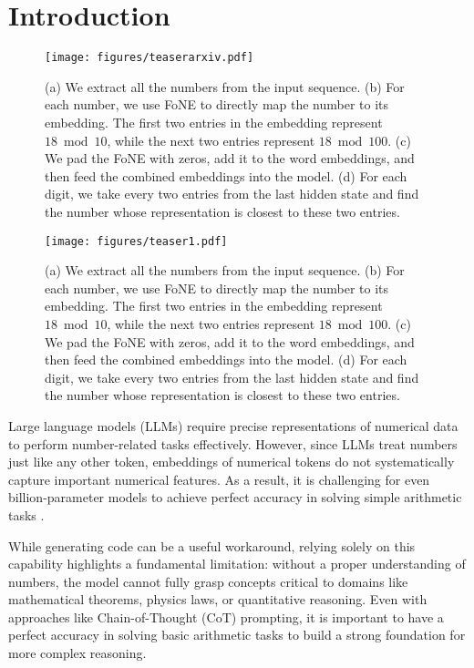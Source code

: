 \section{Introduction}

\ifdefined\isarxiv
\begin{figure}[!ht]
    \centering
    \texttt{[image: figures/teaserarxiv.pdf]}
    \caption{(a) We extract all the numbers from the input sequence.
     (b) For each number, we use FoNE to directly map the number to its embedding. The first two entries in the embedding represent \( 18 \bmod 10 \), while the next two entries represent \( 18 \bmod 100 \).
     (c) We pad the FoNE with zeros, add it to the word embeddings, and then feed the combined embeddings into the model.
     (d) For each digit, we take every two entries from the last hidden state and find the number whose representation is closest to these two entries.}
    \label{fig:teaser1}
\end{figure}
\else
\begin{figure}[!ht]
    \centering
    \texttt{[image: figures/teaser1.pdf]}
    \caption{(a) We extract all the numbers from the input sequence.
     (b) For each number, we use FoNE to directly map the number to its embedding. The first two entries in the embedding represent \( 18 \bmod 10 \), while the next two entries represent \( 18 \bmod 100 \).
     (c) We pad the FoNE with zeros, add it to the word embeddings, and then feed the combined embeddings into the model.
     (d) For each digit, we take every two entries from the last hidden state and find the number whose representation is closest to these two entries.}
    \label{fig:teaser1}
    \vspace{-6mm}
\end{figure}
\fi


Large language models (LLMs) require precise representations of numerical data to perform number-related tasks effectively. 
However, since LLMs treat numbers just like any other token, embeddings of numerical tokens do not systematically capture important numerical features. As a result, it is challenging for even billion-parameter models to achieve perfect accuracy in solving simple arithmetic tasks \cite{saxton2019analysing,dziri2024faith,lee2023teaching,shen2023positional,zhou2023algorithms}.

While generating code can be a useful workaround, relying solely on this capability highlights a fundamental limitation: without a proper understanding of numbers, the model cannot fully grasp concepts critical to domains like mathematical theorems, physics laws, or quantitative reasoning. 
Even with approaches like Chain-of-Thought (CoT) prompting, it is important to have a perfect accuracy in solving basic arithmetic tasks to build a strong foundation for more complex reasoning. 

